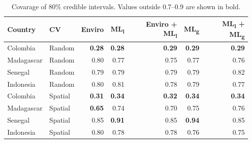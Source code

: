 \documentclass[11pt]{article}
\begin{document}
\begin{table}[h!]
\caption{Covarage of 80\% credible intervals. Values outside 0.7--0.9 are shown in bold.}
\centering
\begin{tabular}{llrrrrr}
Country &  CV & Enviro & ML\textsubscript{l} &  Enviro + ML\textsubscript{l} & ML\textsubscript{g} & ML\textsubscript{l} + ML\textsubscript{g} \\
\hline 
 Colombia & Random & \textbf{0.28} & \textbf{0.28} & \textbf{0.29} & \textbf{0.29} & \textbf{0.29} \\
 Madagascar &  Random & 0.80 & 0.77& 0.75& 0.77& 0.76 \\
 Senegal & Random &0.79 & 0.79& 0.79& 0.79& 0.82 \\
 Indonesia & Random &0.80 & 0.81& 0.78& 0.79& 0.77  \\
 Colombia &  Spatial & \textbf{0.31} & \textbf{0.34}  & \textbf{0.32} & \textbf{0.34} & \textbf{0.34}  \\
 Madagascar & Spatial & \textbf{0.65} & 0.74& 0.70& 0.75 & 0.76   \\
 Senegal & Spatial & 0.85 & \textbf{0.91}& 0.85& \textbf{0.94} & 0.85  \\
  Indonesia & Spatial & 0.80 & 0.78& 0.78& 0.76& 0.75  \\
\end{tabular}
\label{t:results2}
\end{table}
\end{document}
